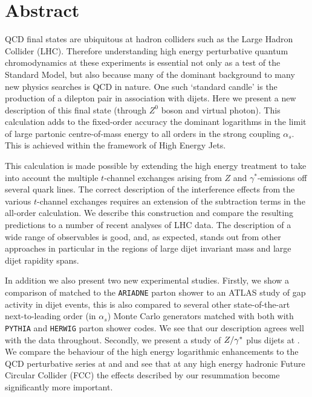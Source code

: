 \chapter*{Abstract}
\noindent
	QCD final states are ubiquitous at hadron colliders such as the Large Hadron Collider (LHC).
	Therefore understanding high energy perturbative quantum chromodynamics at these experiments
	is essential not only as a test of the Standard Model, but also because many of the dominant
	background to many new physics searches is QCD in nature.  One such `standard candle' is the
	production of a dilepton pair in association with dijets.  Here we present a new description
	of this final state (through $Z^0$ boson and virtual photon).  This calculation adds to the
	fixed-order accuracy the dominant logarithms in the limit of large partonic centre-of-mass
	energy to all orders in the strong coupling $\alpha_s$.  This is achieved within the framework
	of High Energy Jets.

	This calculation is made possible by extending the high energy treatment to take into account
	the multiple $t$-channel exchanges arising from $Z$ and $\gamma^*$-emissions off several
	quark lines. The correct description of the interference effects from the various $t$-channel
	exchanges requires an extension of the subtraction terms in the all-order calculation.  We
	describe this construction and compare the resulting predictions to a number of recent analyses
	of LHC data. The description of a wide range of observables is good, and, as expected, stands
	out from other approaches in particular in the regions of large dijet invariant mass and large
	dijet rapidity spans.

	In addition we also present two new experimental studies.  Firstly, we show a comparison of \hej
	matched to the \texttt{ARIADNE} parton shower to an ATLAS study of gap activity in dijet events,
	this is also compared to several other state-of-the-art next-to-leading order (in $\alpha_s$)
	Monte Carlo generators matched with both with \texttt{PYTHIA} and \texttt{HERWIG} parton shower
	codes.  We see that our description agrees well with the data throughout.  Secondly, we present
	a study of $Z/\gamma^*$ plus dijets at \htev.  We compare the behaviour of the high energy logarithmic
	enhancements to the QCD perturbative series at \stev and \htev and see that at any high energy
	hadronic Future Circular Collider (FCC) the effects described by our resummation become
	significantly more important.

\vspace{10mm}
\normalsize

